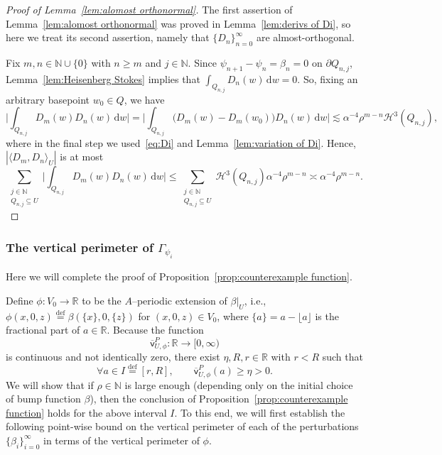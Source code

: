 \documentclass[11pt,reqno]{amsart}
\newcommand{\N}{\mathbb{N}}
\newcommand{\R}{\mathbb{R}}
\newcommand{\cH}{\mathcal{H}}
\newcommand{\ud}[0]{\,\mathrm{d}}
\newcommand{\0}{\mathbf{0}}
\renewcommand{\1}{\mathbf 1}
\newcommand{\from}{\colon}
\renewcommand{\subset}{\subseteq}
\newcommand{\eqdef}{\stackrel{\mathrm{def}}{=}}
\renewcommand{\ge}{\geqslant}
\renewcommand{\le}{\leqslant}
\theoremstyle{remark}
\newcommand{\vpP}[1]{{\overline{\mathsf{v}}^{P}_{\!#1}}}
\begin{document}
\begin{proof}[{Proof of Lemma~\ref{lem:alomost orthonormal}}] The first assertion of Lemma~\ref{lem:alomost orthonormal} was proved in  Lemma~\ref{lem:derivs of Di}, so here we treat its second assertion, namely that $\{D_n\}_{n=0}^\infty$ are almost-orthogonal.

Fix  $m,n\in \N\cup\{0\}$ with $n\ge m$ and $j\in \N$.   Since $\psi_{n+1}-\psi_{n}=\beta_n=0$ on $\partial Q_{n,j}$, Lemma~\ref{lem:Heisenberg Stokes} implies that $\int_{Q_{n,j}} D_n(w) \ud w=0$. So, fixing an arbitrary basepoint $w_0\in Q$, we have
\begin{equation*}
\biggl|\int_{Q_{n,j}} D_m(w) D_n(w) \ud w\biggr|=\biggl|\int_{Q_{n,j}} \big(D_m(w)-D_m(w_0)\big) D_n(w) \ud w\biggr|
\lesssim \alpha^{-4}\rho^{m-n}\cH^3(Q_{n,j}),
\end{equation*}
where in the final step we used~\eqref{eq:Di} and  Lemma~\ref{lem:variation of Di}. Hence, $ |\langle D_m,  D_n\rangle_U|$ is at most
  \begin{equation*}
 \sum_{\substack{j\in \N\\ Q_{n,j}\subset U}} \biggl|\int_{Q_{n,j}} D_m(w) D_n(w) \ud w\biggr|
    \le \sum_{\substack{j\in \N\\ Q_{n,j}\subset U}} \cH^3(Q_{n,j}) \alpha^{-4} \rho^{m-n} \asymp \alpha^{-4} \rho^{m-n}.\tag*{\qedhere}
  \end{equation*}
\end{proof}


\subsubsection{The vertical perimeter of $\Gamma_{\psi_i}$} Here we will complete the proof of Proposition~\ref{prop:counterexample function}.

 Define $\phi\from V_0\to \R$ to be the $A$--periodic extension of $\beta|_U$, i.e., $\phi(x,0,z)\eqdef\beta(\{x\},0,\{z\})$ for $(x,0,z)\in V_0$, where $\{a\}=a-\lfloor a\rfloor$ is the fractional part of $a\in \R$. Because the function
 $$
 \vpP{U,\phi}\from \R\to [0,\infty)
 $$
 is  continuous and not identically zero, there exist $\eta,R,r\in \R$ with $r<R$ such that
 \begin{equation}\label{eq:choose I}
 \forall  a\in I\eqdef [r,R],\qquad \vpP{U,\phi}(a)\ge \eta>0.
 \end{equation}
 We will show that if $\rho\in \N$ is large enough (depending only on the initial choice of bump function $\beta$), then the conclusion of Proposition~\ref{prop:counterexample function} holds for the above interval $I$. To this end, we will first establish the following point-wise bound on the vertical perimeter of each of the perturbations $\{\beta_i\}_{i=0}^\infty$ in terms of the vertical perimeter of $\phi$.
\end{document}
